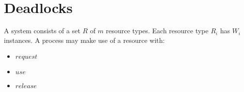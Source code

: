 \section{Deadlocks}

A system consists of a set $R$ of $m$ resource types. Each resource type $R_i$ has $W_i$ instances.
A process may make use of a resource with:
\begin{itemize}
    \item $request$
    \item $use$
    \item $release$
\end{itemize}



